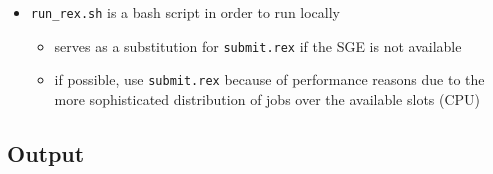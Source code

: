 \begin{itemize}
\item \texttt{run\_rex.sh} is a bash script in order to run locally
\begin{itemize}
  \item serves as a substitution for \texttt{submit.rex} if the SGE is not available
  \item if possible, use \texttt{submit.rex} because of performance reasons due to the more sophisticated distribution of jobs over the available slots (CPU)
\end{itemize}

% 
% 
 \end{itemize}
% 
\subsection{Output}

